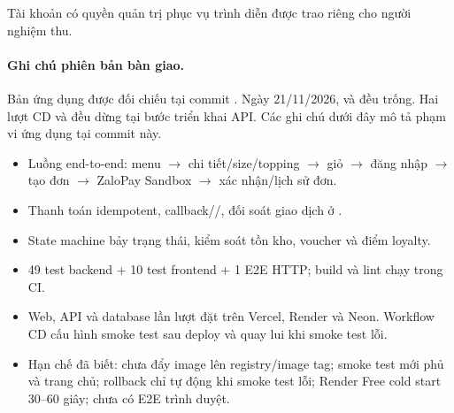 Tài khoản có quyền quản trị phục vụ trình diễn được trao riêng cho người nghiệm thu.

\paragraph{Ghi chú phiên bản bàn giao.}
Bản ứng dụng được đối chiếu tại commit .
Ngày 21/11/2026,  và 
đều trống. Hai lượt CD 
và  đều dừng tại bước triển khai API.
Các ghi chú dưới đây mô tả phạm vi ứng dụng tại commit này.

\begin{itemize}
  \item Luồng end-to-end: menu $\rightarrow$ chi tiết/size/topping $\rightarrow$ giỏ $\rightarrow$
    đăng nhập $\rightarrow$ tạo đơn $\rightarrow$ ZaloPay Sandbox $\rightarrow$ xác nhận/lịch sử
    đơn.
  \item Thanh toán idempotent, callback//, đối soát giao dịch ở
    .
  \item State machine bảy trạng thái, kiểm soát tồn kho, voucher và điểm loyalty.
  \item 49 test backend + 10 test frontend + 1 E2E HTTP; build và lint chạy trong CI.
  \item Web, API và database lần lượt đặt trên Vercel, Render và Neon. Workflow CD
    cấu hình smoke test sau deploy và quay lui khi smoke test lỗi.
  \item Hạn chế đã biết: chưa đẩy image lên registry/image tag; smoke test mới phủ 
    và trang chủ; rollback chỉ tự động khi smoke test lỗi; Render Free cold start 30--60 giây;
    chưa có E2E trình duyệt.
\end{itemize}

